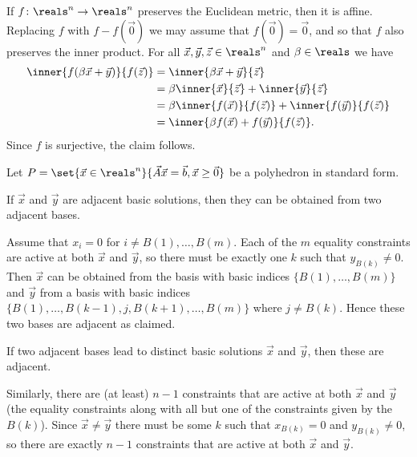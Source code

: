 \documentclass[article, a4paper, 11pt, oneside]{memoir}
\numberwithin{equation}{chapter}
\theoremstyle{nonumberplain}
\newenvironment{displaytheorem}{%
	\begin{displayquote}\itshape%
}{%
	\end{displayquote}%
}
\begin{document}
\begin{remark}
    If $f \colon \reals^n \to \reals^n$ preserves the Euclidean metric, then it is affine. Replacing $f$ with $f - f(\vec{0})$ we may assume that $f(\vec{0}) = \vec{0}$, and so that $f$ also preserves the inner product. For all $\vec{x},\vec{y},\vec{z} \in \reals^n$ and $\beta \in \reals$ we have
    \begin{align*}
        \inner{f(\beta\vec{x} + \vec{y})}{f(\vec{z})}
            &= \inner{\beta\vec{x} + \vec{y}}{\vec{z}} \\
            &= \beta \inner{\vec{x}}{\vec{z}} + \inner{\vec{y}}{\vec{z}} \\
            &= \beta \inner{f(\vec{x})}{f(\vec{z})} + \inner{f(\vec{y})}{f(\vec{z})} \\
            &= \inner{\beta f(\vec{x}) + f(\vec{y})}{f(\vec{z})}.
    \end{align*}
    Since $f$ is surjective, the claim follows.
\end{remark}


\begin{remarkbreak}
    Let $P = \set{\vec{x} \in \reals^n}{\mat{A}\vec{x} = \vec{b}, \vec{x} \geq \vec{0}}$ be a polyhedron in standard form.
    \begin{displaytheorem}
        If $\vec{x}$ and $\vec{y}$ are adjacent basic solutions, then they can be obtained from two adjacent bases.
    \end{displaytheorem}
    Assume that $x_i = 0$ for $i \neq B(1), \ldots, B(m)$. Each of the $m$ equality constraints are active at both $\vec{x}$ and $\vec{y}$, so there must be exactly one $k$ such that $y_{B(k)} \neq 0$. Then $\vec{x}$ can be obtained from the basis with basic indices $\{B(1), \ldots, B(m)\}$ and $\vec{y}$ from a basis with basic indices $\{B(1), \ldots, B(k-1), j, B(k+1), \ldots, B(m)\}$ where $j \neq B(k)$. Hence these two bases are adjacent as claimed.

    \begin{displaytheorem}
        If two adjacent bases lead to distinct basic solutions $\vec{x}$ and $\vec{y}$, then these are adjacent.
    \end{displaytheorem}
    Similarly, there are (at least) $n-1$ constraints that are active at both $\vec{x}$ and $\vec{y}$ (the equality constraints along with all but one of the constraints given by the $B(k)$). Since $\vec{x} \neq \vec{y}$ there must be some $k$ such that $x_{B(k)} = 0$ and $y_{B(k)} \neq 0$, so there are exactly $n-1$ constraints that are active at both $\vec{x}$ and $\vec{y}$.
\end{remarkbreak}
\end{document}
